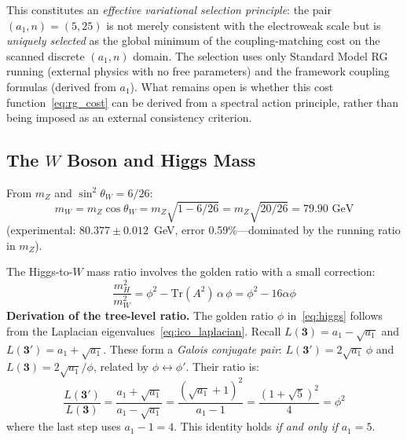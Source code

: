 \documentclass[12pt,a4paper]{article}
\theoremstyle{definition}
\begin{document}
This constitutes an \emph{effective variational selection principle}: the pair $(a_1, n) = (5, 25)$ is not merely consistent with the electroweak scale but is \emph{uniquely selected} as the global minimum of the coupling-matching cost on the scanned discrete $(a_1, n)$ domain.  The selection uses only Standard Model RG running (external physics with no free parameters) and the framework coupling formulas (derived from $a_1$).  What remains open is whether this cost function~\eqref{eq:rg_cost} can be derived from a spectral action principle, rather than being imposed as an external consistency criterion.

\subsection{The \texorpdfstring{$W$}{W} Boson and Higgs Mass}

From $m_Z$ and $\sin^2\theta_W = 6/26$:
\begin{equation}
m_W = m_Z \cos\theta_W = m_Z \sqrt{1 - 6/26} = m_Z\sqrt{20/26} = 79.90 \text{ GeV}
\end{equation}
(experimental: $80.377 \pm 0.012$~GeV, error 0.59\%---dominated by the running ratio in $m_Z$).

The Higgs-to-$W$ mass ratio involves the golden ratio with a small correction:
\begin{equation}
\boxed{\frac{m_H^2}{m_W^2} = \phi^2 - \mathrm{Tr}(A^2)\,\alpha\,\phi = \phi^2 - 16\alpha\phi}
\label{eq:higgs}
\end{equation}
\textbf{Derivation of the tree-level ratio.}  The golden ratio $\phi$ in~\eqref{eq:higgs} follows from the Laplacian eigenvalues~\eqref{eq:ico_laplacian}.  Recall $L(\mathbf{3}) = a_1 - \sqrt{a_1}$ and $L(\mathbf{3'}) = a_1 + \sqrt{a_1}$.  These form a \emph{Galois conjugate pair}: $L(\mathbf{3'}) = 2\sqrt{a_1}\,\phi$ and $L(\mathbf{3}) = 2\sqrt{a_1}/\phi$, related by $\phi \leftrightarrow \phi'$.  Their ratio is:
\begin{equation}
\frac{L(\mathbf{3'})}{L(\mathbf{3})} = \frac{a_1 + \sqrt{a_1}}{a_1 - \sqrt{a_1}} = \frac{(\sqrt{a_1}+1)^2}{a_1 - 1} = \frac{(1+\sqrt{5})^2}{4} = \phi^2
\label{eq:higgs_laplacian}
\end{equation}
where the last step uses $a_1 - 1 = 4$.  This identity holds \emph{if and only if} $a_1 = 5$.
\end{document}
